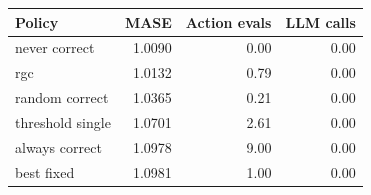 \begin{tabular}{lrrr}
\toprule
Policy & MASE & Action evals & LLM calls \\
\midrule
never correct & 1.0090 & 0.00 & 0.00 \\
rgc & 1.0132 & 0.79 & 0.00 \\
random correct & 1.0365 & 0.21 & 0.00 \\
threshold single & 1.0701 & 2.61 & 0.00 \\
always correct & 1.0978 & 9.00 & 0.00 \\
best fixed & 1.0981 & 1.00 & 0.00 \\
\bottomrule
\end{tabular}
